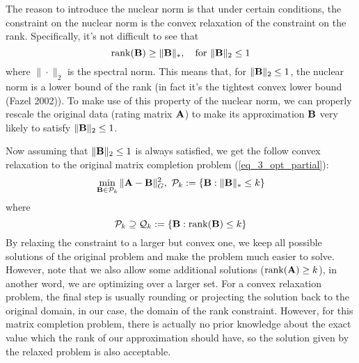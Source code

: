 \documentclass[../book-template.tex]{subfiles}
\begin{document}
The reason to introduce the nuclear norm is that under certain conditions, the constraint on the nuclear norm is the convex relaxation of the constraint on the rank. Specifically, it's not difficult to see that
\begin{equation*}
	\operatorname{rank}({\bf B})\geq \|{\bf B}\|_*,\quad \text{for }\|{\bf B}\|_2\leq 1
\end{equation*}
where $\|\cdot\|_2$ is the spectral norm. This means that, for $\|{\bf B}\|_2\leq 1$, the nuclear norm is a lower bound of the rank (in fact it's the tightest convex lower bound (Fazel 2002)). To make use of this property of the nuclear norm, we can properly rescale the original data (rating matrix ${\bf A}$) to make its approximation ${\bf B}$ very likely to satisfy $\|{\bf B}\|_2\leq 1$.
\par Now assuming that $\|{\bf B}\|_2\leq 1$ is always satisfied, we get the follow convex relaxation to the original matrix completion problem (\ref{eq_3_opt_partial}):
\begin{equation*}
	\min_{{\bf B}\in \mathcal{P}_k}\|{\bf A}-{\bf B}\|^2_G,\ \mathcal{P}_k:=\{{\bf B}:\|{\bf B}\|_*\leq k\}
\end{equation*}
where
\begin{equation*}
	\mathcal{P}_k\supseteq \mathcal{Q}_k:=\{{\bf B}:\operatorname{rank}({\bf B})\leq k\}
\end{equation*}
By relaxing the constraint to a larger but convex one, we keep all possible solutions of the original problem and make the problem much easier to solve. However, note that we also allow some additional solutions ($\operatorname{rank}({\bf A})\geq k$), in another word, we are optimizing over a larger set. For a convex relaxation problem, the final step is usually rounding or projecting the solution back to the original domain, in our case, the domain of the rank constraint. However, for this matrix completion problem, there is actually no prior knowledge about the exact value which the rank of our approximation should have, so the solution given by the relaxed problem is also acceptable.
\end{document}
